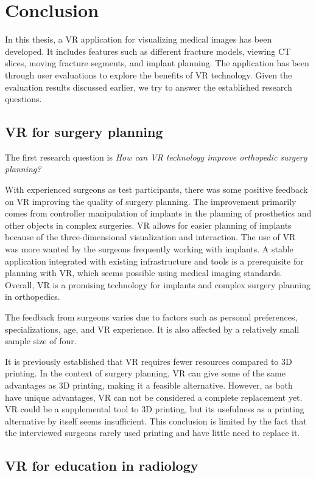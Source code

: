 \documentclass[a4paper]{report}
\begin{document}
\chapter{Conclusion}
In this thesis, a VR application for visualizing medical images has been developed. It includes features such as different fracture models, viewing CT slices, moving fracture segments, and implant planning.
The application has been through user evaluations to explore the benefits of VR technology.
Given the evaluation results discussed earlier, we try to answer the established research questions.

\section{VR for surgery planning}

The first research question is \emph{How can VR technology improve orthopedic surgery planning?}

With experienced surgeons as test participants, there was some positive feedback on VR improving the quality of surgery planning. The improvement primarily comes from controller manipulation of implants in the planning of prosthetics and other objects in complex surgeries. VR allows for easier planning of implants because of the three-dimensional visualization and interaction. The use of VR was more wanted by the surgeons frequently working with implants.
A stable application integrated with existing infrastructure and tools is a prerequisite for planning with VR, which seems possible using medical imaging standards.
Overall, VR is a promising technology for implants and complex surgery planning in orthopedics.

The feedback from surgeons varies due to factors such as personal preferences, specializations, age, and VR experience. It is also affected by a relatively small sample size of four.

It is previously established that VR requires fewer resources compared to 3D printing. In the context of surgery planning, VR can give some of the same advantages as 3D printing, making it a feasible alternative. However, as both have unique advantages, VR can not be considered a complete replacement yet. VR could be a supplemental tool to 3D printing, but its usefulness as a printing alternative by itself seems insufficient. This conclusion is limited by the fact that the interviewed surgeons rarely used printing and have little need to replace it.

\section{VR for education in radiology}
\end{document}
